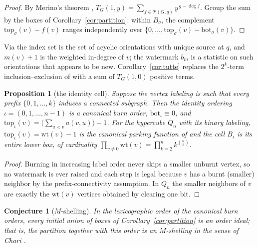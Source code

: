 \documentclass[11pt]{amsart}
\newtheorem{proposition}[theorem]{Proposition}
\newtheorem{conjecture}[theorem]{Conjecture}
\theoremstyle{definition}
\newcommand{\PF}{\mathcal{P}}
\newcommand{\bott}[1]{\mathrm{bot}_{#1}}
\newcommand{\topp}[1]{\mathrm{top}_{#1}}
\begin{document}
\begin{proof}
By Merino's theorem \cite{merino97}, $T_G(1,y)=\sum_{f\in\PF(G,q)}
y^{\,g-\deg f}$. Group the sum by the boxes of
Corollary~\ref{cor:partition}: within $B_\sigma$, the complement
$\topp{\sigma}(v)-f(v)$ ranges independently over
$\{0,\dots,\topp{\sigma}(v)-\bott{\sigma}(v)\}$.
\end{proof}

Via \cite[Thm.~3.1]{bct} the index set is the set of acyclic orientations
with unique source at $q$, and $m(v)+1$ is the weighted in-degree of $v$;
the watermark $b_m$ is a statistic on such orientations that appears to be
new. Corollary~\ref{cor:tutte} replaces the $2^k$-term inclusion--exclusion
of \cite[Cor.~3.3]{bct} with a sum of $T_G(1,0)$ positive terms.

\begin{proposition}[the identity cell]\label{prop:identity}
Suppose the vertex labeling is such that every prefix
$\{0,1,\dots,k\}$ induces a connected subgraph. Then the identity ordering
$\iota=(0,1,\dots,n-1)$ is a canonical burn order, $\bott{\iota}\equiv 0$, and
$\topp{\iota}(v)=\bigl(\sum_{u<v}a(v,u)\bigr)-1$. For the hypercube $Q_n$
with its binary labeling, $\topp{\iota}(v)=\mathrm{wt}(v)-1$ is the
canonical parking function of \cite[Thm.~5.2]{bct} and the cell $B_\iota$ is
its entire lower box, of cardinality $\prod_{v\neq 0}\mathrm{wt}(v)
= \prod_{k=2}^n k^{\binom nk}$.
\end{proposition}

\begin{proof}
Burning in increasing label order never skips a smaller unburnt vertex, so
no watermark is ever raised and each step is legal because $v$ has a burnt
(smaller) neighbor by the prefix-connectivity assumption. In $Q_n$ the
smaller neighbors of $v$ are exactly the $\mathrm{wt}(v)$ vertices obtained
by clearing one bit.
\end{proof}

\begin{conjecture}[$M$-shelling]\label{conj:shelling}
In the lexicographic order of the canonical burn orders, every initial union
of boxes of Corollary~\ref{cor:partition} is an order ideal; that is, the
partition together with this order is an $M$-shelling in the sense of Chari
\cite{chari}.
\end{conjecture}
\end{document}
